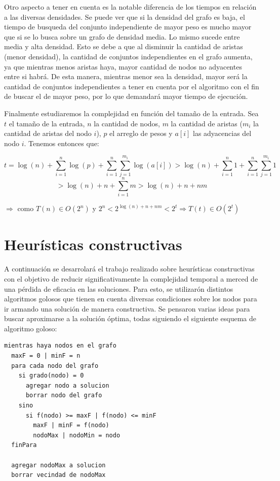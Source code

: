 \documentclass[a4paper,11pt] {article}
\begin{document}
Otro aspecto a tener en cuenta es la notable diferencia de los tiempos en relaci\'on a las diversas densidades. Se puede ver que si la densidad del grafo es baja, el tiempo de busqueda del conjunto independiente de mayor peso es mucho mayor que si se lo busca sobre un grafo de densidad media. Lo mismo sucede entre media y alta densidad. Esto se debe a que al disminuir la cantidad de aristas (menor densidad), la cantidad de conjuntos independientes en el grafo aumenta, ya que mientras menos aristas haya, mayor cantidad de nodos no adyacentes entre si habr\'a. De esta manera, mientras menor sea la densidad, mayor ser\'a la cantidad de conjuntos independientes a tener en cuenta por el algoritmo con el fin de buscar el de mayor peso, por lo que demandar\'a mayor tiempo de ejecuci\'on.

Finalmente estudiaremos la complejidad en funci\'on del tama\~{n}o de la entrada. Sea $t$ el tama\~{n}o de la entrada, $n$ la cantidad de nodos, $m$ la cantidad de aristas ($m_i$ la cantidad de aristas del nodo $i$), $p$ el arreglo de pesos y $a[i]$ las adyacencias del nodo $i$. Tenemos entonces que:

$$t=\log(n)+\sum_{i=1}^{n}\log(p)+\sum_{i=1}^{n}\sum_{j=1}^{m_i}\log(a[i])>\log(n)+\sum_{i=1}^{n}1+\sum_{i=1}^{n}\sum_{j=1}^{m_i}1$$
$$>\log(n)+n+\sum_{i=1}^{n}m>\log(n)+n+nm$$

\hspace{45pt} $\Longrightarrow$ como $T(n) \in O(2^{n})$ y $2^{n}<2^{\log(n)+n+nm}<2^{t} \Longrightarrow T(t) \in O(2^{t})$

\bigskip

\section{Heur\'isticas constructivas}

A continuaci\'on se desarrolar\'a el trabajo realizado sobre heur\'isticas constructivas con el objetivo de reducir significativamente la complejidad temporal a merced de una p\'erdida de eficacia en las soluciones. Para esto, se utilizar\'on distintos algoritmos golosos que tienen en cuenta diversas condiciones sobre los nodos para ir armando una soluci\'on de manera constructiva. Se pensaron varias ideas para buscar aproximarse a la soluci\'on \'optima, todas siguiendo el siguiente esquema de algoritmo goloso:

\begin{verbatim}
mientras haya nodos en el grafo
  maxF = 0 | minF = n
  para cada nodo del grafo
    si grado(nodo) = 0
      agregar nodo a solucion
      borrar nodo del grafo
    sino
      si f(nodo) >= maxF | f(nodo) <= minF
        maxF | minF = f(nodo)
        nodoMax | nodoMin = nodo
  finPara

  agregar nodoMax a solucion
  borrar vecindad de nodoMax
\end{verbatim}
\end{document}
